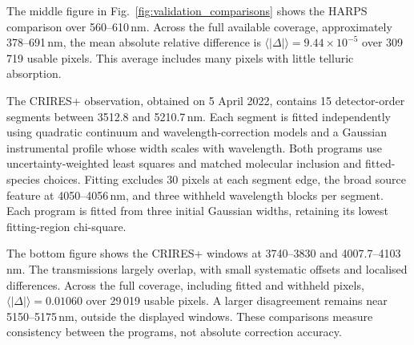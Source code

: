 \documentclass{aa}
\begin{document}
The middle figure in Fig.~\ref{fig:validation_comparisons} shows the HARPS comparison over 560--610\,nm. Across the full available coverage, approximately 378--691\,nm, the mean absolute relative difference is $\langle|\Delta|\rangle=9.44\times10^{-5}$ over 309\,719 usable pixels. This average includes many pixels with little telluric absorption.

The CRIRES+ observation, obtained on 5 April 2022, contains 15 detector-order segments between 3512.8 and 5210.7\,nm. Each segment is fitted independently using quadratic continuum and wavelength-correction models and a Gaussian instrumental profile whose width scales with wavelength. Both programs use uncertainty-weighted least squares and matched molecular inclusion and fitted-species choices. Fitting excludes 30 pixels at each segment edge, the broad source feature at 4050--4056\,nm, and three withheld wavelength blocks per segment. Each program is fitted from three initial Gaussian widths, retaining its lowest fitting-region chi-square.

The bottom figure shows the CRIRES+ windows at 3740--3830 and 4007.7--4103\,nm. The transmissions largely overlap, with small systematic offsets and localised differences. Across the full coverage, including fitted and withheld pixels, $\langle|\Delta|\rangle=0.01060$ over 29\,019 usable pixels. A larger disagreement remains near 5150--5175\,nm, outside the displayed windows. These comparisons measure consistency between the programs, not absolute correction accuracy.
\end{document}
